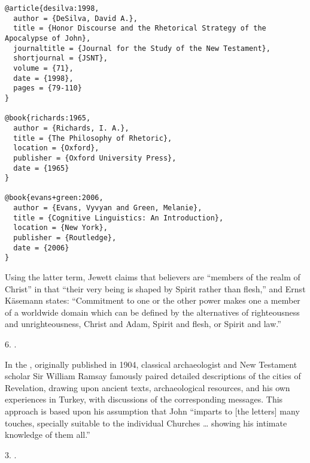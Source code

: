 \documentclass[a4paper]{article}
\begin{document}
\begin{verbatim}
@article{desilva:1998,
  author = {DeSilva, David A.},
  title = {Honor Discourse and the Rhetorical Strategy of the Apocalypse of John},
  journaltitle = {Journal for the Study of the New Testament},
  shortjournal = {JSNT},
  volume = {71},
  date = {1998},
  pages = {79-110}
}

@book{richards:1965,
  author = {Richards, I. A.},
  title = {The Philosophy of Rhetoric},
  location = {Oxford},
  publisher = {Oxford University Press},
  date = {1965}
}

@book{evans+green:2006,
  author = {Evans, Vyvyan and Green, Melanie},
  title = {Cognitive Linguistics: An Introduction},
  location = {New York},
  publisher = {Routledge},
  date = {2006}
}
\end{verbatim}

\begingroup
{}
\setcounter{footnote}{5}
\begin{verbcite}
  Using the latter term, Jewett claims that believers are “members of the
  realm of Christ” in that “their very being is shaped by Spirit rather than
  flesh,” and Ernst Käsemann states: “Commitment to one or the other power
  makes one a member of a worldwide domain which can be defined by the
  alternatives of righteousness and unrighteousness, Christ and Adam, Spirit
  and flesh, or Spirit and
  law.”\autocites[489]{jewett:2007}[220]{kasemann:1981}
\end{verbcite}
\endgroup
\par
\strut\quad{}6.
\cites[489]{jewett:2007}[220]{kasemann:1981}.
\par
\begingroup
{}
\setcounter{footnote}{2}
\begin{verbcite}
  In the , originally published in 1904, classical
  archaeologist and New Testament scholar Sir William Ramsay famously paired
  detailed descriptions of the cities of Revelation, drawing upon ancient
  texts, archaeological resources, and his own experiences in Turkey, with
  discussions of the corresponding messages. This approach is based upon his
  assumption that John “imparts to [the letters] many touches, specially
  suitable to the individual Churches … showing his intimate knowledge of them
  all.”\autocite[39]{ramsay:1906}
\end{verbcite}
\endgroup
\par
\strut\quad{}3.
\cites[39]{ramsay:1906}.
\begin{fverbcite}{3}
  \autocites[16]{ricoeur:1978}[16]{koller:2004}
\end{fverbcite}
\end{document}
